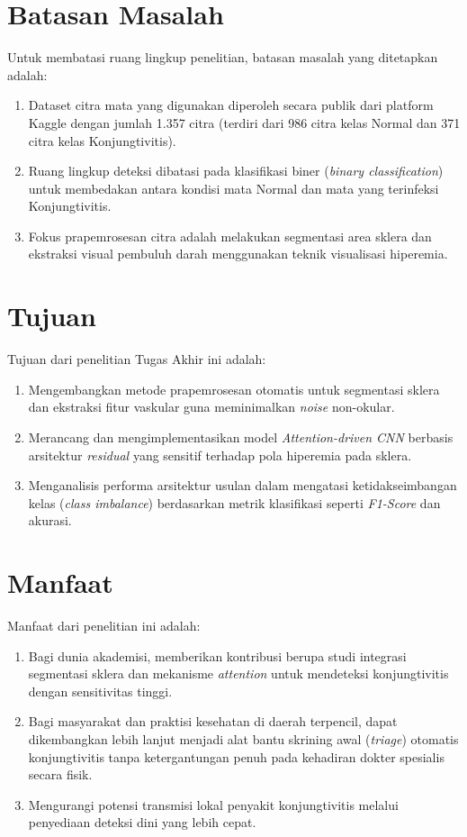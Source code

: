 \section{Batasan Masalah}
\label{sec:batasan-masalah}

Untuk membatasi ruang lingkup penelitian, batasan masalah yang ditetapkan adalah:
\begin{enumerate}[itemsep=1pt]
  \item Dataset citra mata yang digunakan diperoleh secara publik dari platform Kaggle dengan jumlah 1.357 citra (terdiri dari 986 citra kelas Normal dan 371 citra kelas Konjungtivitis).
  \item Ruang lingkup deteksi dibatasi pada klasifikasi biner (\textit{binary classification}) untuk membedakan antara kondisi mata Normal dan mata yang terinfeksi Konjungtivitis.
  \item Fokus prapemrosesan citra adalah melakukan segmentasi area sklera dan ekstraksi visual pembuluh darah menggunakan teknik visualisasi hiperemia.
\end{enumerate}

\section{Tujuan}
\label{sec:tujuan}

Tujuan dari penelitian Tugas Akhir ini adalah:
\begin{enumerate}[nolistsep]
  \item Mengembangkan metode prapemrosesan otomatis untuk segmentasi sklera dan ekstraksi fitur vaskular guna meminimalkan \textit{noise} non-okular.
  \item Merancang dan mengimplementasikan model \textit{Attention-driven CNN} berbasis arsitektur \textit{residual} yang sensitif terhadap pola hiperemia pada sklera.
  \item Menganalisis performa arsitektur usulan dalam mengatasi ketidakseimbangan kelas (\textit{class imbalance}) berdasarkan metrik klasifikasi seperti \textit{F1-Score} dan akurasi.
\end{enumerate}

\section{Manfaat}
\label{sec:manfaat}

Manfaat dari penelitian ini adalah:
\begin{enumerate}[nolistsep]
  \item Bagi dunia akademisi, memberikan kontribusi berupa studi integrasi segmentasi sklera dan mekanisme \textit{attention} untuk mendeteksi konjungtivitis dengan sensitivitas tinggi.
  \item Bagi masyarakat dan praktisi kesehatan di daerah terpencil, dapat dikembangkan lebih lanjut menjadi alat bantu skrining awal (\textit{triage}) otomatis konjungtivitis tanpa ketergantungan penuh pada kehadiran dokter spesialis secara fisik.
  \item Mengurangi potensi transmisi lokal penyakit konjungtivitis melalui penyediaan deteksi dini yang lebih cepat.
\end{enumerate}

